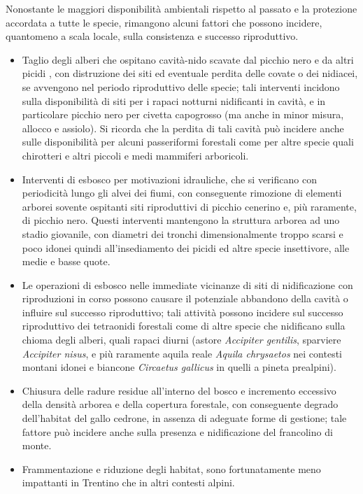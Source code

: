 \documentclass[10pt,twoside,openany,x11names,svgnames,italian,a5paper,dvipsnames,table]{memoir}
\begin{document}
Nonostante le maggiori disponibilità ambientali rispetto al passato e la protezione accordata a tutte le specie, rimangono alcuni fattori che possono incidere, quantomeno a scala locale, sulla consistenza e successo riproduttivo. 

\begin{itemize}\itemsep0pt
  \item Taglio degli alberi che ospitano cavità-nido scavate dal picchio nero e da altri picidi , con distruzione dei siti ed eventuale perdita delle covate o dei nidiacei, se avvengono nel periodo riproduttivo delle specie; tali interventi incidono sulla disponibilità di siti per i rapaci notturni nidificanti in cavità, e in particolare picchio nero per civetta capogrosso (ma anche in minor misura, allocco e assiolo). Si ricorda che la perdita di tali cavità può incidere anche sulle disponibilità per alcuni passeriformi forestali come per altre specie quali chirotteri e altri piccoli e medi mammiferi arboricoli.
  \item Interventi di esbosco per motivazioni idrauliche, che si verificano con periodicità lungo gli alvei dei fiumi, con conseguente rimozione di elementi arborei sovente ospitanti siti riproduttivi di picchio cenerino e, più raramente, di picchio nero. Questi interventi mantengono la struttura arborea ad uno stadio giovanile, con diametri dei tronchi dimensionalmente troppo scarsi e poco idonei quindi all’insediamento dei picidi ed altre specie insettivore, alle medie e basse quote.
  \item Le operazioni di esbosco nelle immediate vicinanze di siti di nidificazione con riproduzioni in corso possono causare il potenziale abbandono della cavità o influire sul successo riproduttivo; tali attività possono incidere sul successo riproduttivo dei tetraonidi forestali come di altre specie che nidificano sulla chioma degli alberi, quali rapaci diurni (astore \emph{Accipiter gentilis}, sparviere \emph{Accipiter nisus}, e più raramente aquila reale \emph{Aquila chrysaetos} nei contesti montani idonei e biancone \emph{Circaetus gallicus} in quelli a pineta prealpini).
  \item Chiusura delle radure residue all’interno del bosco e incremento eccessivo della densità arborea e della copertura forestale, con conseguente degrado dell’habitat del gallo cedrone, in assenza di adeguate forme di gestione; tale fattore può incidere anche sulla presenza e nidificazione del francolino di monte.
  \item Frammentazione e riduzione degli habitat, sono fortunatamente meno impattanti in Trentino che in altri contesti alpini.

\end{itemize}
\end{document}
